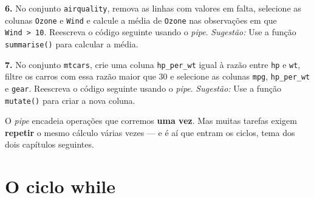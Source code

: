 \documentclass[
  portuguese,
  11pt,
  openany]{book}
\newenvironment{Shaded}{\begin{snugshade}}{\end{snugshade}}
\newcommand{\DecValTok}[1]{\textcolor[rgb]{0.00,0.00,0.81}{#1}}
\newcommand{\FunctionTok}[1]{\textcolor[rgb]{0.13,0.29,0.53}{\textbf{#1}}}
\newcommand{\NormalTok}[1]{#1}
\newcommand{\OtherTok}[1]{\textcolor[rgb]{0.56,0.35,0.01}{#1}}
\newcommand{\SpecialCharTok}[1]{\textcolor[rgb]{0.81,0.36,0.00}{\textbf{#1}}}
\begin{document}
\textbf{6.} No conjunto \texttt{airquality}, remova as linhas com valores em falta, selecione as
colunas \texttt{Ozone} e \texttt{Wind} e calcule a média de \texttt{Ozone} nas observações em que
\texttt{Wind\ \textgreater{}\ 10}. Reescreva o código seguinte usando o \emph{pipe}.
\emph{Sugestão:} Use a função \texttt{summarise()} para calcular a média.

\begin{Shaded}
\end{Shaded}

\textbf{7.} No conjunto \texttt{mtcars}, crie uma coluna \texttt{hp\_per\_wt} igual à razão entre \texttt{hp} e
\texttt{wt}, filtre os carros com essa razão maior que 30 e selecione as colunas \texttt{mpg},
\texttt{hp\_per\_wt} e \texttt{gear}. Reescreva o código seguinte usando o \emph{pipe}.
\emph{Sugestão:} Use a função \texttt{mutate()} para criar a nova coluna.

\begin{Shaded}
\end{Shaded}

O \emph{pipe} encadeia operações que corremos \textbf{uma vez}. Mas muitas tarefas exigem
\textbf{repetir} o mesmo cálculo várias vezes --- e é aí que entram os ciclos, tema dos
dois capítulos seguintes.

\chapter{O ciclo while}\label{while}
\end{document}
